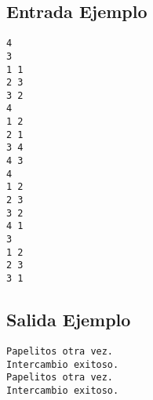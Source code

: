 \begin{multicols}{2}

\subsection*{Entrada Ejemplo}

\begin{verbatim}
4
3
1 1
2 3
3 2
4
1 2
2 1
3 4
4 3
4
1 2
2 3
3 2
4 1
3
1 2
2 3
3 1
\end{verbatim}

\columnbreak

\subsection*{Salida Ejemplo}

\begin{verbatim}
Papelitos otra vez.
Intercambio exitoso.
Papelitos otra vez.
Intercambio exitoso.
\end{verbatim}

\end{multicols}